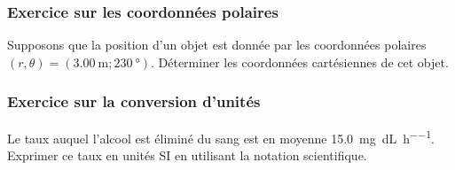 \documentclass{beamer}
\begin{document}
\begin{frame}
  \frametitle{Exercice sur les coordonnées polaires}
  Supposons que la position d'un objet est donnée par les coordonnées
  polaires $(r, \theta) = (\SI{3.00}{\meter}; \SI{230}{\degree})$.  Déterminer les
  coordonnées cartésiennes de cet objet.

\end{frame}


\begin{frame}
  \frametitle{Exercice sur la conversion d'unités}

  Le taux auquel l'alcool est éliminé du sang est en moyenne
  \SI{15.0}{\milli\gram\per\deci\liter\per\hour}.  Exprimer ce taux en unités
  SI en utilisant la notation scientifique.

\end{frame}
\end{document}
